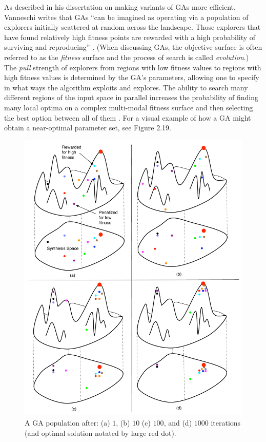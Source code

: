 \documentclass[12pt]{report} 	%
\numberwithin{figure}{chapter}
\numberwithin{table}{chapter}
\numberwithin{equation}{chapter}
\begin{document}
\begin{flushleft}
As described in his dissertation on making variants of GAs more efficient, Vanneschi writes that GAs ``can be imagined as operating via a population of explorers initially scattered at random across the landscape. Those explorers that have found relatively high fitness points are rewarded with a high probability of surviving and reproducing'' \cite[p. 70]{Vanneschi:2004le}. (When discussing GAs, the objective surface is often referred to as the \textit{fitness} surface and the process of search is called \textit{evolution}.) The \textit{pull} strength of explorers from regions with low fitness values to regions with high fitness values is determined by the GA's parameters, allowing one to specify in what ways the algorithm exploits and explores. The ability to search many different regions of the input space in parallel increases the probability of finding many local optima on a complex multi-modal fitness surface and then selecting the best option between all of them \cite[p. 37]{Garcia:2001jw}. For a visual example of how a GA might obtain a near-optimal parameter set, see Figure 2.19.
\begin{figure}[h!]
\begin{center}
\includegraphics[scale=0.50]{GASearch}
\caption[GA example]{A GA population after: (a) $1$, (b) $10$ (c) $100$, and (d) $1000$ iterations (and optimal solution notated by large red dot).}
\end{center}
\end{figure}


\end{flushleft}
\end{document}
